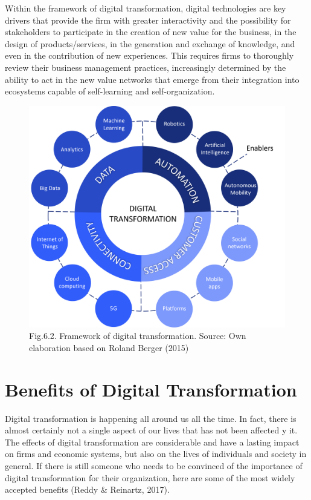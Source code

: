 \documentclass[
  letterpaper,
  DIV=11,
  numbers=noendperiod]{scrreprt}
\begin{document}
Within the framework of digital transformation, digital technologies are
key drivers that provide the firm with greater interactivity and the
possibility for stakeholders to participate in the creation of new value
for the business, in the design of products/services, in the generation
and exchange of knowledge, and even in the contribution of new
experiences. This requires firms to thoroughly review their business
management practices, increasingly determined by the ability to act in
the new value networks that emerge from their integration into
ecosystems capable of self-learning and self-organization.

\begin{figure}

{\centering \includegraphics[width=6.25in,height=\textheight]{img/fig3.png}

}

\caption{Fig.6.2. Framework of digital transformation. Source: Own
elaboration based on Roland Berger (2015)}

\end{figure}

\hypertarget{benefits-of-digital-transformation}{%
\section{Benefits of Digital
Transformation}\label{benefits-of-digital-transformation}}

Digital transformation is happening all around us all the time. In fact,
there is almost certainly not a single aspect of our lives that has not
been affected y it. The effects of digital transformation are
considerable and have a lasting impact on firms and economic systems,
but also on the lives of individuals and society in general. If there is
still someone who needs to be convinced of the importance of digital
transformation for their organization, here are some of the most widely
accepted benefits (Reddy \& Reinartz, 2017).
\end{document}
